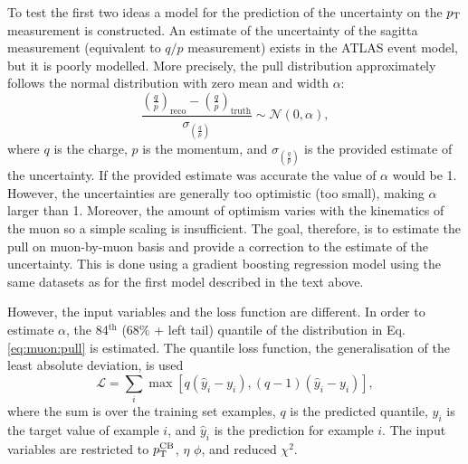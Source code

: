 To test the first two ideas a model for the prediction of the uncertainty
on the $p_{\text{T}}$ measurement is constructed. An estimate of the uncertainty
of the sagitta measurement (equivalent to $q/p$ measurement) exists in the
ATLAS event model, but it is poorly modelled. More precisely, the
pull distribution approximately follows the normal distribution with
zero mean and width $\alpha$:
\begin{equation}
\frac{\left(\frac{q}{p}\right)_\text{reco}
- \left(\frac{q}{p}\right)_\text{truth}}
{\sigma_{\left(\frac{q}{p}\right)}}
\sim \mathcal{N}(0, \alpha),
\label{eq:muon:pull}
\end{equation}
where $q$ is the charge, $p$ is the momentum, and
$\sigma_{\left(\frac{q}{p}\right)}$ is the provided estimate of the
uncertainty. If the provided estimate was accurate the value of $\alpha$
would be 1. However, the uncertainties are generally too optimistic (too
small), making $\alpha$ larger than 1. Moreover, the amount of optimism varies with
the kinematics of the muon so a simple scaling is insufficient.
The goal, therefore, is to estimate
the pull on muon-by-muon basis and provide a correction to the estimate
of the uncertainty. This is done using a gradient boosting regression model
using the same datasets as for the first model described in the text above.

However, the input variables and the loss function are different. In order
to estimate $\alpha$, the 84$^\text{th}$ (68\% + left tail) quantile of the
distribution in Eq. \ref{eq:muon:pull} is estimated. The quantile loss
function, the generalisation of the least absolute deviation, is used \cite{qreg}
\begin{equation}
\mathcal{L} = \sum_{i}\max \left[ q (\hat{y}_i - y_i), (q-1)(\hat{y}_i - y_i)\right],
\end{equation}
where the sum is over the training set examples, $q$ is the predicted quantile,
$y_i$ is the target value of example $i$, and $\hat{y}_i$ is the prediction
for example $i$. The input variables are restricted to $p_{\text{T}}^\text{CB}$, $\eta$
$\phi$, and reduced $\chi^2$.

